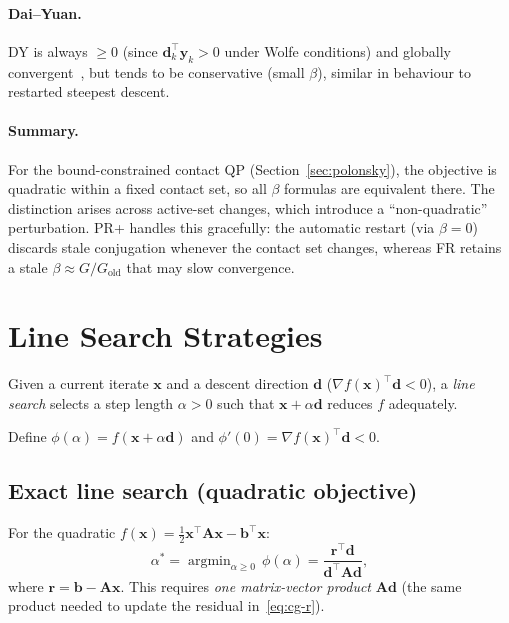 \documentclass[11pt,a4paper]{article}
\newcommand{\bA}{\mathbf{A}}
\newcommand{\bb}{\mathbf{b}}
\newcommand{\br}{\mathbf{r}}
\newcommand{\bd}{\mathbf{d}}
\newcommand{\bx}{\mathbf{x}}
\newcommand{\by}{\mathbf{y}}
\newcommand{\tr}{\top}
\begin{document}
\paragraph{Dai--Yuan.}
DY is always $\geq 0$ (since $\bd_k^\tr\by_k > 0$ under Wolfe conditions) and
globally convergent~\cite{DaiYuan1999}, but tends to be conservative (small $\beta$),
similar in behaviour to restarted steepest descent.

\paragraph{Summary.}
For the bound-constrained contact QP (Section~\ref{sec:polonsky}), the objective is
quadratic within a fixed contact set, so all $\beta$ formulas are equivalent there.
The distinction arises across active-set changes, which introduce a ``non-quadratic''
perturbation.  PR+ handles this gracefully: the automatic restart (via $\beta = 0$)
discards stale conjugation whenever the contact set changes, whereas FR retains
a stale $\beta \approx G/G_{\mathrm{old}}$ that may slow convergence.

\section{Line Search Strategies}
\label{sec:linesearch}

Given a current iterate $\bx$ and a descent direction $\bd$
($\nabla f(\bx)^\tr\bd < 0$), a \emph{line search} selects a step length
$\alpha > 0$ such that $\bx + \alpha\bd$ reduces $f$ adequately.

Define $\phi(\alpha) = f(\bx + \alpha\bd)$ and
$\phi'(0) = \nabla f(\bx)^\tr\bd < 0$.

\subsection{Exact line search (quadratic objective)}

For the quadratic $f(\bx) = \tfrac{1}{2}\bx^\tr\bA\bx - \bb^\tr\bx$:
\begin{equation}
  \alpha^* = \operatorname{argmin}_{\alpha \geq 0}\,\phi(\alpha)
           = \frac{\br^\tr \bd}{\bd^\tr \bA \bd},
  \label{eq:exact-ls}
\end{equation}
where $\br = \bb - \bA\bx$.  This requires \emph{one matrix-vector product}
$\bA\bd$ (the same product needed to update the residual in~\eqref{eq:cg-r}).
\end{document}
